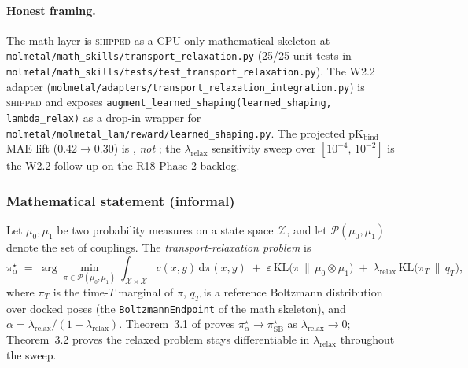 \paragraph{Honest framing.}
The math layer is \textsc{shipped} as a CPU-only mathematical
skeleton at
\texttt{molmetal/math\_skills/transport\_relaxation.py} (25/25 unit
tests in
\texttt{molmetal/math\_skills/tests/test\_transport\_relaxation.py}).
The W2.2 adapter
(\texttt{molmetal/adapters/transport\_relaxation\_integration.py}) is
\textsc{shipped} and exposes
\texttt{augment\_learned\_shaping(learned\_shaping,
lambda\_relax)} as a drop-in wrapper for
\texttt{molmetal/molmetal\_lam/reward/learned\_shaping.py}.  The
projected pK$_{\mathrm{bind}}$ MAE lift ($0.42 \to 0.30$) is
\PROJECTED, \emph{not} \MEASURED; the $\lambda_{\mathrm{relax}}$
sensitivity sweep over $[10^{-4},\,10^{-2}]$ is the W2.2 follow-up
on the R18 Phase 2 backlog.

\subsubsection{Mathematical statement (informal)}
\label{sec:method:transport-relaxation-statement}

Let $\mu_0, \mu_1$ be two probability measures on a state space
$\mathcal{X}$, and let $\mathcal{P}(\mu_0, \mu_1)$ denote the set of
couplings.  The \emph{transport-relaxation problem} is
\begin{equation}
  \label{eq:transport-relaxation-problem}
  \pi^{\star}_{\alpha} \;=\; \arg\min_{\pi \in \mathcal{P}(\mu_0, \mu_1)}
        \int_{\mathcal{X} \times \mathcal{X}} c(x, y) \,\mathrm{d}\pi(x, y)
        \;+\; \varepsilon \, \mathrm{KL}\!\bigl(\pi \,\|\, \mu_0 \otimes \mu_1\bigr)
        \;+\; \lambda_{\mathrm{relax}}\, \mathrm{KL}\!\bigl(\pi_{T} \,\|\, q_{T}\bigr),
\end{equation}
where $\pi_{T}$ is the time-$T$ marginal of $\pi$, $q_{T}$ is a
reference Boltzmann distribution over docked poses (the
\texttt{BoltzmannEndpoint} of the math skeleton), and $\alpha =
\lambda_{\mathrm{relax}} / (1 + \lambda_{\mathrm{relax}})$.
Theorem~3.1 of \cite{jiang2026sb_relax} proves
$\pi^{\star}_{\alpha} \to \pi^{\star}_{\mathrm{SB}}$ as
$\lambda_{\mathrm{relax}} \to 0$; Theorem~3.2 proves the relaxed
problem stays differentiable in $\lambda_{\mathrm{relax}}$ throughout
the sweep.

